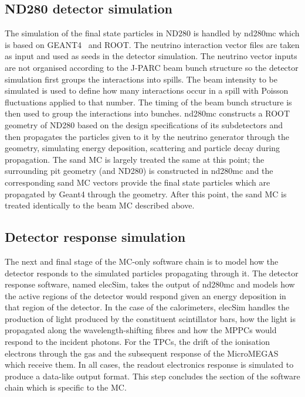 \subsection{ND280 detector simulation}
\label{subsec:ND280DetectorSimulation}
The simulation of the final state particles in ND280 is handled by nd280mc which is based on GEANT4~\cite{Agostinelli2003250} and ROOT.  The neutrino interaction vector files are taken as input and used as seeds in the detector simulation.  The neutrino vector inputs are not organised according to the J-PARC beam bunch structure so the detector simulation first groups the interactions into spills.  The beam intensity to be simulated is used to define how many interactions occur in a spill with Poisson fluctuations applied to that number.  The timing of the beam bunch structure is then used to group the interactions into bunches. 
\newline
\newline
nd280mc constructs a ROOT geometry of ND280 based on the design specifications of its subdetectors and then propagates the particles given to it by the neutrino generator through the geometry, simulating energy deposition, scattering and particle decay during propagation.
\newline
\newline
The sand MC is largely treated the same at this point; the surrounding pit geometry (and ND280) is constructed in nd280mc and the corresponding sand MC vectors provide the final state particles which are propagated by Geant4 through the geometry.  After this point, the sand MC is treated identically to the beam MC described above.

\subsection{Detector response simulation}
\label{subsec:DetectorResponseSimulation}
The next and final stage of the MC-only software chain is to model how the detector responds to the simulated particles propagating through it.  The detector response software, named elecSim, takes the output of nd280mc and models how the active regions of the detector would respond given an energy deposition in that region of the detector.  In the case of the calorimeters, elecSim handles the production of light produced by the constituent scintillator bars, how the light is propagated along the wavelength-shifting fibres and how the MPPCs would respond to the incident photons.  For the TPCs, the drift of the ionisation electrons through the gas and the subsequent response of the MicroMEGAS which receive them.  In all cases, the readout electronics response is simulated to produce a data-like output format.  This step concludes the section of the software chain which is specific to the MC.


